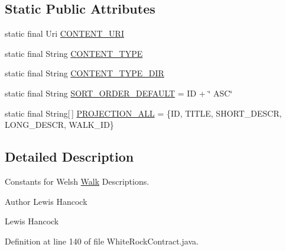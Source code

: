 \subsection*{Static Public Attributes}
\begin{DoxyCompactItemize}
\item 
static final Uri \hyperlink{classuk_1_1ac_1_1swan_1_1digitaltrails_1_1database_1_1_white_rock_contract_1_1_welsh_walk_descriptions_aabfc760037e8b4181add4e0b022ca055}{C\+O\+N\+T\+E\+N\+T\+\_\+\+U\+R\+I}
\item 
static final String \hyperlink{classuk_1_1ac_1_1swan_1_1digitaltrails_1_1database_1_1_white_rock_contract_1_1_welsh_walk_descriptions_ab24624c2425d0338c572a919565ddfe5}{C\+O\+N\+T\+E\+N\+T\+\_\+\+T\+Y\+P\+E}
\item 
static final String \hyperlink{classuk_1_1ac_1_1swan_1_1digitaltrails_1_1database_1_1_white_rock_contract_1_1_welsh_walk_descriptions_aaaa739b13df8edb07583f4237aa7e7b1}{C\+O\+N\+T\+E\+N\+T\+\_\+\+T\+Y\+P\+E\+\_\+\+D\+I\+R}
\item 
static final String \hyperlink{classuk_1_1ac_1_1swan_1_1digitaltrails_1_1database_1_1_white_rock_contract_1_1_welsh_walk_descriptions_a9f5c1e5b89a15c7ba6e18fb77350abe6}{S\+O\+R\+T\+\_\+\+O\+R\+D\+E\+R\+\_\+\+D\+E\+F\+A\+U\+L\+T} = I\+D + \char`\"{} A\+S\+C\char`\"{}
\item 
static final String\mbox{[}$\,$\mbox{]} \hyperlink{classuk_1_1ac_1_1swan_1_1digitaltrails_1_1database_1_1_white_rock_contract_1_1_welsh_walk_descriptions_a0bb6892dd4b3c1c0dc6dcce576ae3a97}{P\+R\+O\+J\+E\+C\+T\+I\+O\+N\+\_\+\+A\+L\+L} = \{I\+D, T\+I\+T\+L\+E, S\+H\+O\+R\+T\+\_\+\+D\+E\+S\+C\+R, L\+O\+N\+G\+\_\+\+D\+E\+S\+C\+R, W\+A\+L\+K\+\_\+\+I\+D\}
\end{DoxyCompactItemize}


\subsection{Detailed Description}
Constants for Welsh \hyperlink{classuk_1_1ac_1_1swan_1_1digitaltrails_1_1database_1_1_white_rock_contract_1_1_walk}{Walk} Descriptions. 

\begin{DoxyAuthor}{Author}
Lewis Hancock 

Lewis Hancock 
\end{DoxyAuthor}


Definition at line 140 of file White\+Rock\+Contract.\+java.



